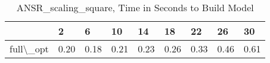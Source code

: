 \begin{table}
\centering
\caption{ANSR\_scaling\_square, Time in Seconds to Build Model}
\label{ANSR_scaling_square_model_time}
\begin{tabular}{lllllllll}
\toprule
{} &     2 &     6 &    10 &    14 &    18 &    22 &    26 &    30 \\
\midrule
full\textbackslash \_opt &  0.20 &  0.18 &  0.21 &  0.23 &  0.26 &  0.33 &  0.46 &  0.61 \\
\bottomrule
\end{tabular}
\end{table}
